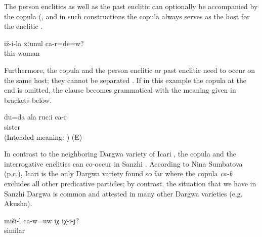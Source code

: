 The person enclitics as well as the past enclitic can optionally be accompanied by the copula (, and in such constructions the copula always serves as the host for the enclitic . 

%
\begin{exe}
	\ex	\label{ex:‎‎‎Are you his wife}
	\gll	iž-i-la	xːunul	ca-r=de=w?\\
		this	woman	\\
	\glt	{}
\end{exe}

Furthermore, the copula and the person enclitic or past enclitic need to occur on the same host; they cannot be separated . If in this example the copula at the end is omitted, the clause becomes grammatical with the meaning given in brackets below. 
%
\begin{exe}
	\ex	\label{ex:It is me who is your sister.}
	\gll	*du=da	ala	rucːi	ca-r\\
				sister	\\
	\glt	(Intended meaning: ) (E)
\end{exe}

In contrast to the neighboring Dargwa variety of Icari \citep[138]{Sumbatova.Mutalov2003}, the copula and the interrogative enclitics can co-occur in Sanzhi . According to Nina Sumbatova (p.c.), Icari is the only Dargwa variety found so far where the copula \textit{ca-b} excludes all other predicative particles; by contrast, the situation that we have in Sanzhi Dargwa is common and attested in many other Dargwa varieties (e.g. Akusha). 

\begin{exe}
	\ex	\label{ex:Is this similar to himSyntax}
	\gll	miši-l	ca-w=uw	iχ	iχ-i-j?\\
		similar		\tsc{dem.down}	\\
	\glt	{}
\end{exe}

